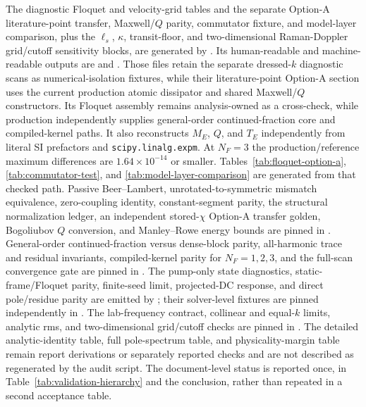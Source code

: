 \documentclass[11pt,a4paper]{article}
\begin{document}
The diagnostic Floquet and velocity-grid tables and the separate Option-A
literature-point transfer, Maxwell/$Q$ parity, commutator fixture, and model-layer
comparison, plus the $\ell_s$, $\kappa$, transit-floor, and two-dimensional
Raman-Doppler grid/cutoff sensitivity blocks,
are generated by
.
Its human-readable and machine-readable outputs are
 and
. Those files retain the separate
dressed-$k$ diagnostic scans as numerical-isolation fixtures, while their
literature-point Option-A section uses the current production atomic dissipator
and shared Maxwell/$Q$ constructors. Its Floquet assembly remains analysis-owned
as a cross-check, while production independently supplies general-order
continued-fraction core and compiled-kernel paths. It also reconstructs $M_E$,
$Q$, and $T_E$ independently from literal SI prefactors and
\texttt{scipy.linalg.expm}. At $N_F=3$ the production/reference maximum
differences are $1.64\times10^{-14}$ or smaller. Tables~\ref{tab:floquet-option-a},
\ref{tab:commutator-test}, and \ref{tab:model-layer-comparison} are generated
from that checked path. Passive Beer--Lambert, unrotated-to-symmetric mismatch
equivalence, zero-coupling identity, constant-segment parity, the structural
normalization ledger, an independent stored-$\chi$ Option-A transfer golden,
Bogoliubov $Q$ conversion, and Manley--Rowe energy bounds are pinned in
.
General-order continued-fraction versus dense-block parity, all-harmonic trace
and residual invariants, compiled-kernel parity for $N_F=1,2,3$, and the
full-scan convergence gate are pinned in .
The pump-only state diagnostics, static-frame/Floquet parity, finite-seed limit,
projected-DC response, and direct pole/residue parity are emitted by
; their solver-level fixtures are pinned independently
in .
The lab-frequency contract, collinear and equal-$k$ limits, analytic rms, and
two-dimensional grid/cutoff checks are pinned in
. The detailed analytic-identity table,
full pole-spectrum table, and physicality-margin table remain report derivations
or separately reported checks and are not described as regenerated by the audit
script.
The document-level status is reported once, in
Table~\ref{tab:validation-hierarchy} and the conclusion, rather than repeated
in a second acceptance table.
\end{document}
